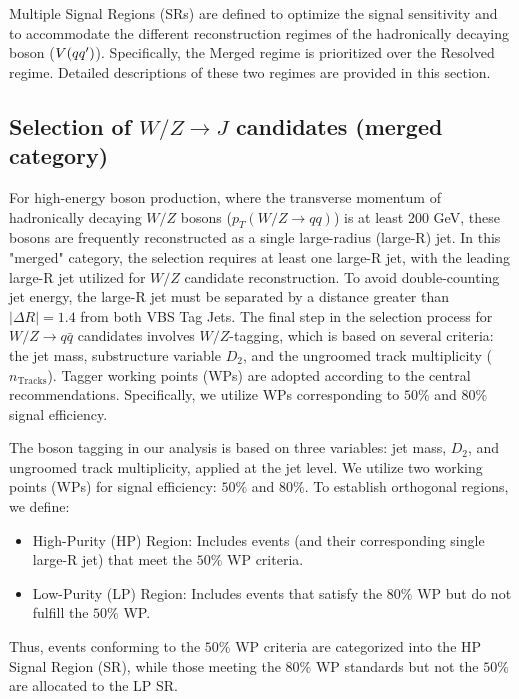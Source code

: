 \label{subsec:sr_selection}

Multiple Signal Regions (SRs) are defined to optimize the signal sensitivity and to accommodate the different reconstruction regimes of the hadronically decaying boson ($V(q q^{\prime})$). Specifically, the Merged regime is prioritized over the Resolved regime. Detailed descriptions of these two regimes are provided in this section.


\subsection{Selection of $W/Z \to J$ candidates (merged category)}
\label{subsubsec:merged_jets_selection}

For high-energy boson production, where the transverse momentum of hadronically decaying $W/Z$ bosons ($p_{T}(W/Z \rightarrow qq)$) is at least 200 GeV, these bosons are frequently reconstructed as a single large-radius (large-R) jet. In this "merged" category, the selection requires at least one large-R jet, with the leading large-R jet utilized for $W/Z$ candidate reconstruction. To avoid double-counting jet energy, the large-R jet must be separated by a distance greater than $|\Delta R| = 1.4$ from both VBS Tag Jets.
%
The final step in the selection process for $W/Z \to q\bar{q}$ candidates involves $W/Z$-tagging, which is based on several criteria: the jet mass, substructure variable $D_2$, and the ungroomed track multiplicity ($n_{\text{Tracks}}$). Tagger working points (WPs) are adopted according to the central recommendations. Specifically, we utilize WPs corresponding to $50\%$ and $80\%$ signal efficiency.

The boson tagging in our analysis is based on three variables: jet mass, $D_2$, and ungroomed track multiplicity, applied at the jet level. We utilize two working points (WPs) for signal efficiency: $50\%$ and $80\%$. To establish orthogonal regions, we define:
\begin{itemize}
    \item High-Purity (HP) Region: Includes events (and their corresponding single large-R jet) that meet the $50\%$ WP criteria.
    \item Low-Purity (LP) Region: Includes events that satisfy the $80\%$ WP but do not fulfill the $50\%$ WP.
\end{itemize}
Thus, events conforming to the $50\%$ WP criteria are categorized into the HP Signal Region (SR), while those meeting the $80\%$ WP standards but not the $50\%$ are allocated to the LP SR.

